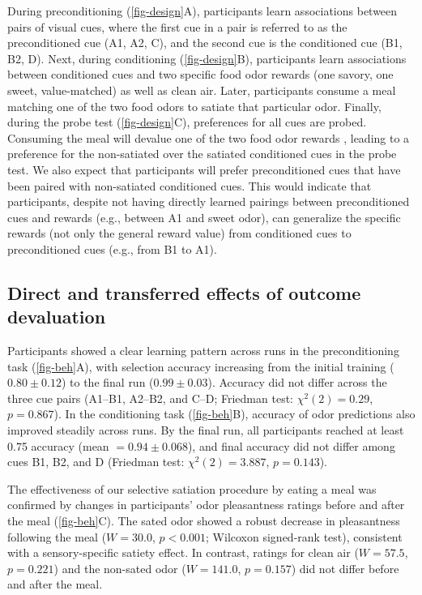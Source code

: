 \documentclass[12pt,letterpaper]{article}
\begin{document}
During preconditioning (\autoref{fig-design}A), participants learn associations between pairs of visual cues, where the first cue in a pair is referred to as the preconditioned cue (A1, A2, C), and the second cue is the conditioned cue (B1, B2, D). Next, during conditioning (\autoref{fig-design}B), participants learn associations between conditioned cues and two specific food odor rewards (one savory, one sweet, value-matched) as well as clean air. Later, participants consume a meal matching one of the two food odors to satiate that particular odor. Finally, during the probe test (\autoref{fig-design}C), preferences for all cues are probed. Consuming the meal will devalue one of the two food odor rewards \cite{howard2017identity,HowRey2020,liu2025distinct}, leading to a preference for the non-satiated over the satiated conditioned cues in the probe test. We also expect that participants will prefer preconditioned cues that have been paired with non-satiated conditioned cues. This would indicate that participants, despite not having directly learned pairings between preconditioned cues and rewards (e.g., between A1 and sweet odor), can generalize the specific rewards (not only the general reward value) from conditioned cues to preconditioned cues (e.g., from B1 to A1).




\subsection*{Direct and transferred effects of outcome devaluation}
\label{subsec-beh}


Participants showed a clear learning pattern across runs in the preconditioning task (\autoref{fig-beh}A), with selection accuracy increasing from the initial training ($0.80 \pm 0.12$) to the final run ($0.99 \pm 0.03$). Accuracy did not differ across the three cue pairs (A1--B1, A2--B2, and C--D; Friedman test: $\chi^2(2) = 0.29$, $p = 0.867$). In the conditioning task (\autoref{fig-beh}B), accuracy of odor predictions also improved steadily across runs. By the final run, all participants reached at least 0.75 accuracy (mean $= 0.94 \pm 0.068$), and final accuracy did not differ among cues B1, B2, and D (Friedman test: $\chi^2(2) = 3.887$, $p = 0.143$).


The effectiveness of our selective satiation procedure by eating a meal was confirmed by changes in participants’ odor pleasantness ratings before and after the meal (\autoref{fig-beh}C). The sated odor showed a robust decrease in pleasantness following the meal ($W = 30.0$, $p < 0.001$; Wilcoxon signed-rank test), consistent with a sensory-specific satiety effect. In contrast, ratings for clean air ($W = 57.5$, $p = 0.221$) and the non-sated odor ($W = 141.0$, $p = 0.157$) did not differ before and after the meal. 
\end{document}

